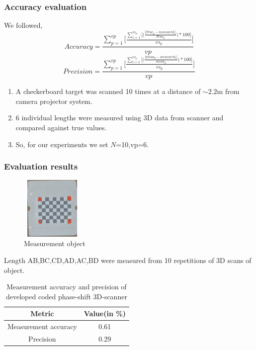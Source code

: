\documentclass[9pt]{beamer}
\begin{document}
\begin{frame}
\frametitle{Accuracy evaluation}
We followed,
\begin{equation}
Accuracy=\frac{\sum_{p=1}^{vp}\Bigg[\frac{\sum_{i=1}^{vs_{p}}\Bigg[\bigg(\frac{|True_{p}-measured_{i}|}{True_{p}}\bigg)*100\Bigg]}{vs_{p}}\Bigg]}{vp}
\end{equation}
\begin{equation}
Precision=\frac{\sum_{p=1}^{vp}\Bigg[\frac{\sum_{i=1}^{vs_{p}}\Bigg[\bigg(\frac{|mean_{p}-measured_{i}|}{mean_{p}}\bigg)*100\Bigg]}{vs_{p}}\Bigg]}{vp}
\end{equation}
\begin{enumerate}
\item A checkerboard target was scanned 10 times at a distance of $\sim2.2$m from camera projector system. 
\item 6 individual lengths were measured using 3D data from scanner and compared against true values.
\item So, for our experiments we set $N$=10,vp=6.
\end{enumerate}
\end{frame}

\begin{frame}
\frametitle{Evaluation results}
\begin{figure}
\includegraphics[width=3cm,height=3cm]{dependencies/img_source/measurement_object.jpg}
\caption{Measurement object}
\end{figure}
Length AB,BC,CD,AD,AC,BD were measured from 10 repetitions of 3D scans of object.
\begin{table}[!t]
\caption{Measurement accuracy and precision of
developed coded phase-shift 3D-scanner}
\centering
\begin{tabular}{|c| |c|}
\hline
Metric & Value(in \%)\\
\hline
Measurement accuracy & 0.61\\
Precision & 0.29 \\ 
\hline
\end{tabular}
\end{table}

\end{frame}
\end{document}
